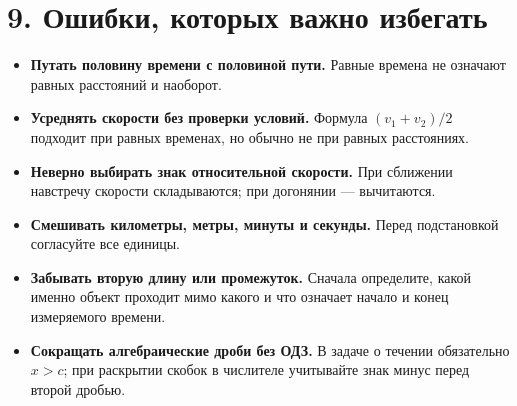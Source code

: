 \documentclass[a4paper,12pt]{article}
\newcommand{\sectiontitle}[1]{\section*{\color{darkaccent}#1}\vspace{-2mm}}
\begin{document}
\sectiontitle{9. Ошибки, которых важно избегать}
\begin{itemize}
\item \textbf{Путать половину времени с половиной пути.} Равные времена не означают равных расстояний и наоборот.
\item \textbf{Усреднять скорости без проверки условий.} Формула $(v_1+v_2)/2$ подходит при равных временах, но обычно не при равных расстояниях.
\item \textbf{Неверно выбирать знак относительной скорости.} При сближении навстречу скорости складываются; при догонянии --- вычитаются.
\item \textbf{Смешивать километры, метры, минуты и секунды.} Перед подстановкой согласуйте все единицы.
\item \textbf{Забывать вторую длину или промежуток.} Сначала определите, какой именно объект проходит мимо какого и что означает начало и конец измеряемого времени.
\item \textbf{Сокращать алгебраические дроби без ОДЗ.} В задаче о течении обязательно $x>c$; при раскрытии скобок в числителе учитывайте знак минус перед второй дробью.
\end{itemize}
\end{document}

